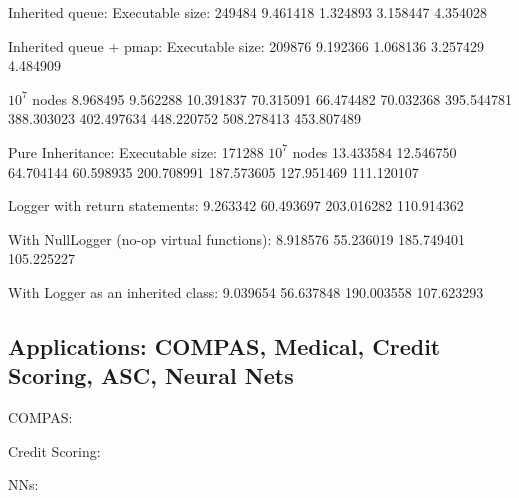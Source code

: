 \documentclass[]{article}
\theoremstyle{definition}
\begin{document}
Inherited queue:
Executable size: 249484
9.461418
1.324893
3.158447
4.354028

Inherited queue + pmap:
Executable size: 209876
9.192366
1.068136
3.257429
4.484909

$10^7$ nodes
8.968495 9.562288 10.391837
70.315091 66.474482 70.032368
395.544781 388.303023 402.497634
448.220752 508.278413 453.807489

Pure Inheritance:
Executable size: 171288
$10^7$ nodes
13.433584 12.546750
64.704144 60.598935
200.708991 187.573605
127.951469 111.120107

Logger with return statements:
9.263342
60.493697
203.016282
110.914362

With NullLogger (no-op virtual functions):
8.918576
55.236019
185.749401
105.225227

With Logger as an inherited class:
9.039654
56.637848
190.003558
107.623293


\subsection{Applications: COMPAS, Medical, Credit Scoring, ASC, Neural Nets}

COMPAS:

Credit Scoring:

NNs:

\printbibliography
\end{document}
